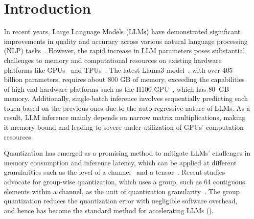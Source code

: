 \section{Introduction}\label{sec:introduction}
In recent years, Large Language Models (LLMs) have demonstrated significant improvements in quality and accuracy across various natural language processing (NLP) tasks~\cite{chowdhery2022palm, scao2022bloom, touvron2023llama, zhang2022opt}.
However, the rapid increase in LLM parameters poses substantial challenges to memory and computational resources on existing hardware platforms like GPUs~\cite{v100,a100,h100} and TPUs~\cite{jouppi2023tpu}.
The latest Llama3 model~\cite{dubey2024llama3herdmodels}, with over 405 billion parameters, requires about 800 GB of memory, exceeding the capabilities of high-end hardware platforms such as the H100 GPU~\cite{h100}, which has 80~GB memory.
Additionally, single-batch inference involves sequentially predicting each token based on the previous ones due to the auto-regressive nature of LLMs.
As a result, LLM inference mainly depends on narrow matrix multiplications, making it memory-bound and leading to severe under-utilization of GPUs' computation resources.



Quantization has emerged as a promising method to mitigate LLMs' challenges in memory consumption and inference latency, which can be applied at different granularities such as the level of a channel~\cite{xiao2023smoothquant,lee2024tenderacceleratinglargelanguage,kim2023squeezellm} and a tensor~\cite{guo2022ant,zadeh2022mokey,zadeh2020gobo}.
Recent studies advocate for group-wise quantization, which uses a group, such as 64 contiguous elements within a channel, as the unit of quantization granularity~\cite{zhao2023atom,lin2023awq,frantar2023gptq,shao2024omniquant,dai2021vsquant,liu2024kivi}.
The group quantization reduces the quantization error with negligible software overhead, and hence has become the standard method for accelerating LLMs ().


